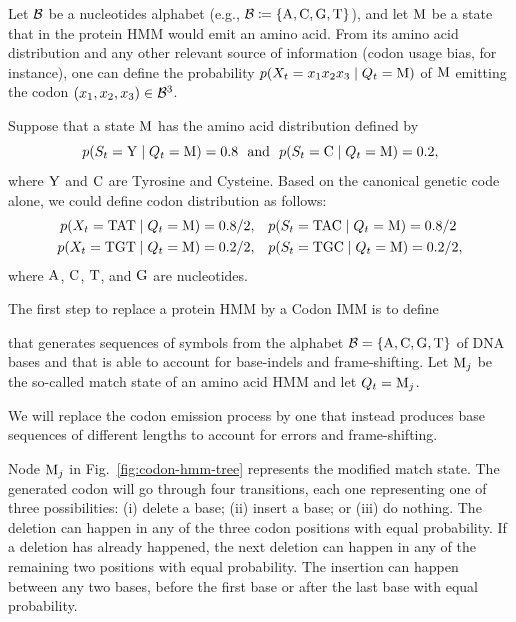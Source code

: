 Let $\mathcal{B}$ be a nucleotides alphabet (e.g., $\mathcal{B} \coloneqq \{\mathrm{A}, \mathrm{C}, \mathrm{G},
\mathrm{T}\}$), and let $\mathrm{M}$ be a state that in the protein HMM would emit an amino acid. From
its amino acid distribution and any other relevant source of information (codon usage bias, for
instance), one can define the probability $p(X_t=x_1x_2x_3 \;|\; Q_t=\mathrm{M})$ of $\mathrm{M}$
emitting the codon $(x_1, x_2, x_3) \in \mathcal{B}^3$.

\begin{example}
  Suppose that a state $\mathrm{M}$ has the amino acid distribution defined by
  \begin{equation*}
    p(S_t=\mathrm{Y} \;|\; Q_t=\mathrm{M}) = 0.8 ~~\text{and}~~ p(S_t=\mathrm{C} \;|\; Q_t=\mathrm{M}) = 0.2,
  \end{equation*}
  where $\mathrm{Y}$ and $\mathrm{C}$ are Tyrosine and Cysteine.
  Based on the canonical genetic code alone, we could define codon distribution as follows:
  \begin{equation*}
    \begin{split}
      p(X_t=\mathrm{TAT}\;|\; Q_t=\mathrm{M})= 0.8/2, &\quad p(S_t=\mathrm{TAC}\;|\; Q_t=\mathrm{M})=0.8/2\\
      p(X_t=\mathrm{TGT}\;|\; Q_t=\mathrm{M})= 0.2/2, &\quad p(S_t=\mathrm{TGC}\;|\; Q_t=\mathrm{M})=0.2/2,
    \end{split}
  \end{equation*}
  where $\mathrm{A}$, $\mathrm{C}$, $\mathrm{T}$, and $\mathrm{G}$ are nucleotides.
\end{example}

The first step to replace a protein HMM by a Codon IMM is to define

that generates sequences of symbols from the alphabet $\mathcal{B} = \{\mathrm{A}, \mathrm{C}, \mathrm{G},
\mathrm{T}\}$ of DNA bases and that is able to account for base-indels and frame-shifting. Let
$\mathrm{M}_j$ be the so-called match state of an amino acid HMM and let $Q_t=\mathrm{M}_j$.

We will replace the codon emission process by one
that instead produces base sequences of different lengths to account for errors and frame-shifting.

Node $\mathrm{M}_j$ in Fig.~\ref{fig:codon-hmm-tree} represents the modified match state.
The generated codon will go through four transitions, each one representing one of three possibilities: (i) delete a base; (ii) insert a base; or (iii) do nothing.
The deletion can happen in any of the three codon positions with equal probability.
If a deletion has already happened, the next deletion can happen in any of the remaining two positions with equal probability.
The insertion can happen between any two bases, before the first base or after the last base with equal probability.

